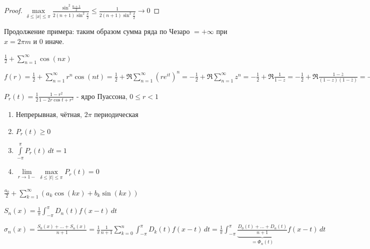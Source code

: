 \begin{example}
\begin{properties}
\begin{enumerate}
{                \begin{proof}
                    $\max\limits_{\delta \leqslant |x| \leqslant \pi} \frac{\sin^2 \frac{n + 1}{2}}{2 (n+1) \sin^2 \frac{x}{2}} \leqslant \frac{1}{2(n+1)\sin^2 \frac{\delta}{2}} \rightarrow 0$
                \end{proof}
            }
        \end{enumerate}
    \end{properties}

    Продолжение примера: таким образом сумма ряда по Чезаро $= +\infty$ при $x = 2\pi m$ и $0$ иначе.
\end{example}

\begin{example}
    $\frac{1}{2} + \sum\limits_{n=1}^\infty \cos (nx)$

    $f(r) = \frac{1}{2} + \sum\limits_{n=1}^\infty r^n \cos (nt) = \frac{1}{2} + \Re \sum\limits_{n=1}^\infty (re^{it})^n = -\frac{1}{2} + \Re \sum\limits_{n=1}^\infty z^n = - \frac{1}{2} + \Re \frac{1}{1 - z} = - \frac{1}{2} + \Re \frac{1 - \bar{z}}{(1 - z)(1 - \bar{z})} = -\frac{1}{2} + \frac{1 - \Re z}{1 + |z|^2 - 2\Re z} =
    - \frac{1}{2} + \frac{1 - r\cos t}{1 - 2r \cos t + r^2} = \frac{1 - r^2}{2(1 - 2r \cos t + r^2)}$
\end{example}

\begin{definition}
    $P_r (t) = \frac{1}{2} \frac{1 - r^2}{1 - 2r \cos t + r^2}$ - ядро Пуассона, $0 \leqslant r < 1$
\end{definition}

\begin{properties}
    \begin{enumerate}
        \item Непрерывная, чётная, $2\pi$ периодическая
        \item {
            $P_r (t) \geqslant 0$
        }
        \item {
            $\int\limits_{-\pi}^\pi P_r (t) \, dt = 1$
        }
        \item {
            $\lim\limits_{r \to 1-} \max\limits_{\delta \leqslant |t| \leqslant \pi} P_r (t) = 0$
        }
    \end{enumerate}

\end{properties}

\begin{example}
    $\frac{a_0}{2} + \sum\limits_{k = 1}^\infty (a_k \cos (kx) + b_k \sin (kx))$

    $S_n (x) = \frac{1}{\pi} \int_{-\pi}^\pi D_n (t) f(x - t) \, dt$

    $\sigma_n (x) = \frac{S_0 (x) + \ldots + S_n (x)}{n + 1} = \frac{1}{\pi} \frac{1}{n+1} \sum\limits_{k = 0}^n \int_{-\pi}^\pi D_k (t) f(x - t) \, dt = \frac{1}{\pi} \int_{-\pi}^\pi \underbrace{\frac{D_0 (t) + \ldots + D_n (t)}{n + 1}}_{=\Phi_n (t)} f(x - t) \, dt $
\end{example}

